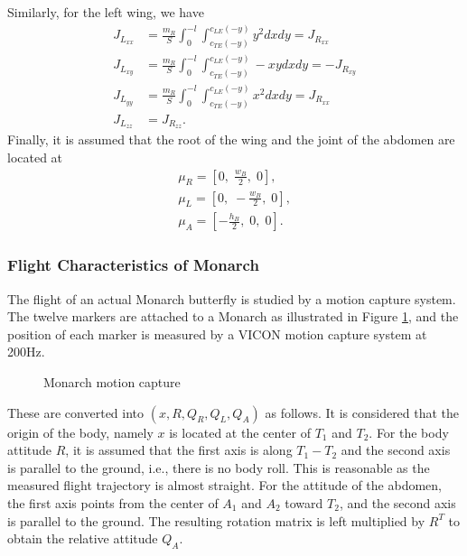 \documentclass[10pt]{article}
\begin{document}
Similarly, for the left wing, we have
\begin{align*}
    J_{L_{xx}} & = \frac{m_R}{S} \int_0^{-l} \int_{c_{TE}(-y)}^{c_{LE}(-y)} y^2 dx dy = J_{R_{xx}} \\
    J_{L_{xy}} & = \frac{m_R}{S} \int_0^{-l} \int_{c_{TE}(-y)}^{c_{LE}(-y)} -xy dx dy = - J_{R_{xy}} \\
    J_{L_{yy}} & = \frac{m_R}{S} \int_0^{-l} \int_{c_{TE}(-y)}^{c_{LE}(-y)} x^2 dx dy = J_{R_{xx}} \\
    J_{L_{zz}} & = J_{R_{zz}}.
\end{align*}
Finally, it is assumed that the root of the wing and the joint of the abdomen are located at
\begin{align*}
    \mu_R = [0,\; \frac{w_B}{2},\; 0],\\
    \mu_L = [0,\; -\frac{w_B}{2},\; 0],\\
    \mu_A = [-\frac{h_B}{2},\; 0,\; 0].
\end{align*}

\subsubsection{Flight Characteristics of Monarch}

The flight of an actual Monarch butterfly is studied by a motion capture system. 
The twelve markers are attached to a Monarch as illustrated in Figure \ref{fig:Monarch_marker},
and the position of each marker is measured by a VICON motion capture system at 200\si{Hz}.

\begin{figure}
    \centerline{
        \hfill
}
\caption{Monarch motion capture}\label{fig:Monarch_marker}
\end{figure}


These are converted into $(x,R,Q_R,Q_L,Q_A)$ as follows. 
It is considered that the origin of the body, namely $x$ is located at the center of $T_1$ and $T_2$. 
For the body attitude $R$, it is assumed that the first axis is along $T_1-T_2$ and the second axis is parallel to the ground, i.e., there is no body roll. 
This is reasonable as the measured flight trajectory is almost straight. 
For the attitude of the abdomen, the first axis points from the center of $A_1$ and $A_2$ toward $T_2$, and the second axis is parallel to the ground. 
The resulting rotation matrix is left multiplied by $R^T$ to obtain the relative attitude $Q_A$. 
\end{document}
